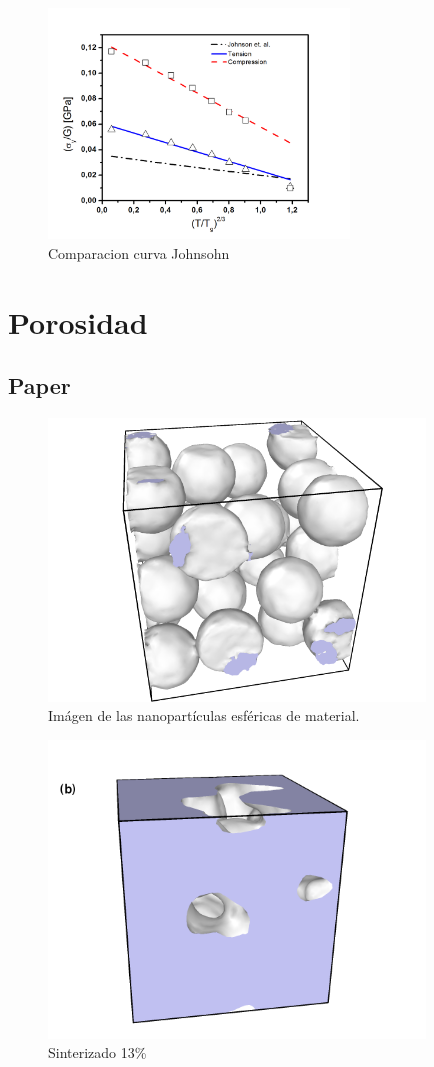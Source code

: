 \documentclass[10pt, oneside]{article} %
\begin{document}
\begin{figure}[H]
\centering
\includegraphics[width=8cm]{Figures/Fit2_Tercios.png}
\caption{Comparacion curva Johnsohn}
\end{figure}


\section{Porosidad}

\subsection{Paper}

\begin{figure}[H]
  \centering
  \includegraphics[width=10cm]{Figures/Porosidad/spheres.png}
  \caption{Imágen de las nanopartículas esféricas de material.}
\end{figure}

\begin{figure}[H]
  \centering
  \includegraphics[width=10cm]{Figures/Porosidad/spheres3.png}
  \caption{Sinterizado 13\%}
\end{figure}
\end{document}
